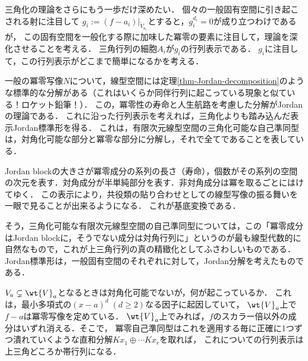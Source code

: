 \documentclass[uplatex, dvipdfmx]{jsreport}
\begin{document}
\begin{tcolorbox}[colframe=ForestGreen, colback=ForestGreen!10!white, breakable]
    三角化の理論をさらにもう一歩だけ深めたい．
    個々の一般固有空間に引き起こされる射に注目して
    $g_i:=(f-a_i)|_{\widetilde{V}_{a_i}}$とすると，$g_i^{d_i}=0$が成り立つわけであるが，
    この固有空間を一般化する際に加味した冪零の要素に注目して，理論を深化させることを考える．
    三角行列の細胞$A_i$が$g_i$の行列表示である．
    $g_i$に注目して，この行列表示がどこまで簡単になるかを考える．

    一般の冪零写像$N$について，線型空間には定理\ref{thm-Jordan-decomposition}のような標準的な分解がある（これはいくらか同伴行列に起こっている現象と似ている！ロケット鉛筆！）．
    この，冪零性の寿命と人生航路を考慮した分解がJordanの理論である．
    これに沿った行列表示を考えれば，三角化よりも踏み込んだ表示Jordan標準形を得る．
    これは，有限次元線型空間の三角化可能な自己準同型は，対角化可能な部分と冪零な部分に分解し，それで全てであることを表している．

    Jordan blockの大きさが冪零成分の系列の長さ（寿命），個数がその系列の空間の次元を表す．対角成分が半単純部分を表す．非対角成分は冪を取るごとにはけてゆく．
    この表示により，共役類の貼り合わせとしての線型写像の振る舞いを一眼で見ることが出来るようになる．
    これが基底変換である．

    そう，三角化可能な有限次元線型空間の自己準同型については，この「冪零成分はJordan blockに，そうでない成分は対角行列に」というのが最も線型代数的に自然なもので，これが上三角行列の真の精緻化としてふさわしいものである．
    Jordan標準形は，一般固有空間のそれぞれに対して，Jordan分解を考えたものである．
\end{tcolorbox}

\begin{tcolorbox}[colframe=ForestGreen, colback=ForestGreen!10!white,breakable,colbacktitle=ForestGreen!40!white,coltitle=black,fonttitle=\bfseries\sffamily,
title=上三角表示の精緻化・一意化]
    $V_a\subsetneq\wt{V}_a$となるときは対角化可能でないが，何が起こっているか．
    これは，最小多項式の$(x-a)^d\;(d\ge2)$なる因子に起因していて，
    $\wt{V}_a$上で$f-a$は冪零写像を定めている．
    $\wt{V}_a$上でみれば，$f$のスカラー倍以外の成分はいずれ消える．そこで，
    冪零自己準同型はこれを適用する毎に正確に1つずつ潰れていくような直和分解$Kx_1\oplus\cdots Kx_r$を取れば，
    これについての行列表示は上三角どころか帯行列になる．
\end{tcolorbox}
\end{document}
